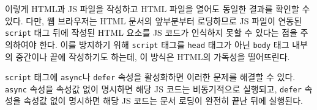 이렇게 HTML과 JS 파일을 작성하고 HTML 파일을 열어도 \과 동일한 결과를 확인할 수 있다. 다만, 웹 브라우저는 HTML 문서의 앞부분부터 로딩하므로 JS 파일이 연동된 \texttt{script} 태그 뒤에 작성된 HTML 요소를 JS 코드가 인식하지 못할 수 있다는 점을 주의하여야 한다. 이를 방지하기 위해 \texttt{script} 태그를 \texttt{head} 태그가 아닌 \texttt{body} 태그 내부의 중간이나 끝에 작성하기도 하는데, 이 방식은 HTML의 가독성을 떨어뜨린다.

\texttt{script} 태그에 \texttt{async}나 \texttt{defer} 속성을 활성화하면 이러한 문제를 해결할 수 있다. \texttt{async} 속성을 속성값 없이 명시하면 해당 JS 코드는 비동기적으로 실행되고, \texttt{defer} 속성을 속성값 없이 명시하면 해당 JS 코드는 문서 로딩이 완전히 끝난 뒤에 실행된다.
